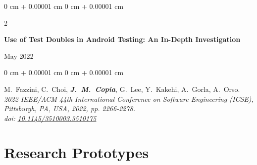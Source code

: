 \documentclass[10pt, letterpaper]{article}
\newenvironment{onecolentry}{
    \begin{adjustwidth}{
        0 cm + 0.00001 cm
    }{
        0 cm + 0.00001 cm
    }
}{
    \end{adjustwidth}
} %
\newenvironment{twocolentry}[2][]{
    \onecolentry
    \def\secondColumn{#2}
    \setcolumnwidth{\fill, 4.5 cm}
    \begin{paracol}{2}
}{
    \switchcolumn \raggedleft \secondColumn
    \end{paracol}
    \endonecolentry
} %
\begin{document}
        \begin{samepage}
            \begin{twocolentry}{
                May 2022
            }
                \textbf{Use of Test Doubles in Android Testing: An In-Depth Investigation}
            \end{twocolentry}

            \vspace{0.10 cm}
            \begin{onecolentry}
                \mbox{M. Fazzini}, \mbox{C. Choi}, \mbox{\textbf{\textit{J. M.
                Copia}}}, \mbox{G. Lee}, \mbox{Y. Kakehi}, \mbox{A. Gorla},
                \mbox{A. Orso}. \\
                \textit{2022 IEEE/ACM 44th International Conference on Software
                Engineering (ICSE), Pittsburgh, PA, USA, 2022, pp. 2266-2278.} \\
                \textit{doi:} \href{https://doi.org/10.1145/3510003.3510175}{\textit{10.1145/3510003.3510175}}

            \end{onecolentry}

        \end{samepage}



\vspace{0.1 cm}

    \section{Research Prototypes}

    \vspace{0.1 cm}
\end{document}
